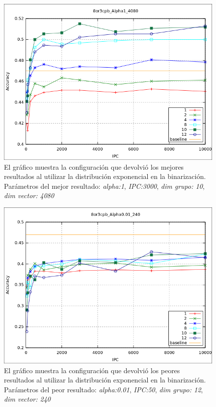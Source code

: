 			\begin{figure}[htbp]
				\centering
				\includegraphics[scale=0.6]{img/resultados/sinteticas/best_expon_8or3cpb_Alpha1_4080.png}
				\caption[Sintéticas exponencial mejor resultado]{El gráfico muestra la configuración que devolvió los mejores resultados al utilizar la distribución exponencial en la binarización. Parámetros del mejor resultado: \textit{alpha:1}, \textit{IPC:3000}, \textit{dim grupo: 10}, \textit{dim vector: 4080}}
				\label{fig: Sinteticas-expon-mejor}
			\end{figure}
	
			\begin{figure}[htbp]
				\centering
				\includegraphics[scale=0.6]{img/resultados/sinteticas/worst_expon_8or3cpb_Alpha0,01_240.png}
				\caption[Sintéticas exponencial peor resultado]{El gráfico muestra la configuración que devolvió los peores resultados al utilizar la distribución exponencial en la binarización. Parámetros del peor resultado: \textit{alpha:0.01}, \textit{IPC:50}, \textit{dim grupo: 12}, \textit{dim vector: 240}}
				\label{fig: Sinteticas-expon-bajo}
			\end{figure}
			
